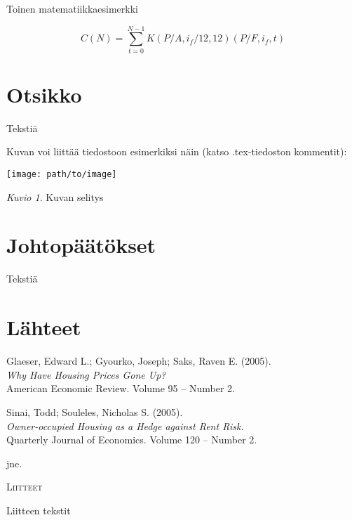 \documentclass[12pt,a4paper,finnish]{article}
\theoremstyle{plain}
\theoremstyle{definition}
\theoremstyle{remark}
\theoremstyle{figure}
\newtheorem{kuvio}[equation]{Kuvio}
\begin{document}
Toinen matematiikkaesimerkki
 
\begin{equation}
    C(N) = \sum_{t=0}^{N-1} K(P/A, i_f/12, 12)(P/F, i_f, t)
\end{equation}

\section{Otsikko}\label{}

Tekstiä

Kuvan voi liittää tiedostoon esimerkiksi näin (katso .tex-tiedoston kommentit):

\centerline{\texttt{[image: path/to/image]}}
\begin{kuvio}
    Kuvan selitys
\end{kuvio}

\section{Johtopäätökset}\label{concl}

Tekstiä

\pagebreak

\section*{Lähteet}

Glaeser, Edward L.; Gyourko, Joseph; Saks, Raven E. (2005).\\
\textit{Why Have Housing Prices Gone Up?}\\
American Economic Review. Volume 95 – Number 2.\\  

\parindent=0pt

Sinai, Todd; Souleles, Nicholas S. (2005).\\
\textit{Owner-occupied Housing as a Hedge against Rent Risk.}\\
Quarterly Journal of Economics. Volume 120 – Number 2.\\  

\parindent=0pt

jne.

\pagebreak

\textsc{Liitteet}

Liitteen tekstit
\end{document}
